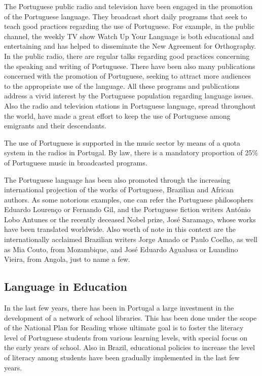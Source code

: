 \begin{multicols}{2}
The Portuguese public radio and television have been engaged in the promotion of the Portuguese language. They broadcast short daily programs 
that seek to teach good practices regarding the use of Portuguese. For example, in the public channel, the weekly TV show Watch Up Your Language is both educational and entertaining 
and has helped to disseminate the New Agreement for Orthography. 
In the public radio, there are regular talks regarding good practices concerning the speaking and writing of Portuguese. 
There have been also many publications concerned with the promotion of Portuguese, seeking to attract more audiences to the appropriate use of the language. 
All these programs and publications address a vivid interest by the Portuguese population regarding language issues. Also the radio and television stations in Portuguese language, spread throughout the world, have made a great effort to keep the use of Portuguese among emigrants and their descendants.

The use of Portuguese is supported in the music sector by means of a quota system in the radios in Portugal. 
By law, there is a mandatory proportion of 25\% of Portuguese music in broadcasted programs.


The Portuguese language has been also promoted through the increasing international projection of the works of Portuguese, Brazilian and African authors. 
As some notorious examples, one can refer the Portuguese philosophers Eduardo Lourenço or Fernando Gil, and the Portuguese fiction writers António Lobo Antunes or the recently deceased Nobel prize, José Saramago, whose works have been translated worldwide. 
Also worth of note in this context are the internationally acclaimed Brazilian writers Jorge Amado or Paulo Coelho, 
as well as Mia Couto, from Mozambique,  and José Eduardo Agualusa or Luandino Vieira, from Angola, just to name a few.

\subsection{Language in Education}

In the last few years, there has been in Portugal a large investment in the development of a network of school libraries. 
This has been done under the scope of the National Plan for Reading whose ultimate goal is to foster the literacy level of Portuguese students from various learning levels, with special focus on the early years of school. Also in Brazil, educational policies to increase the level of literacy among students have been gradually implemented in the last few years.


\end{multicols}
